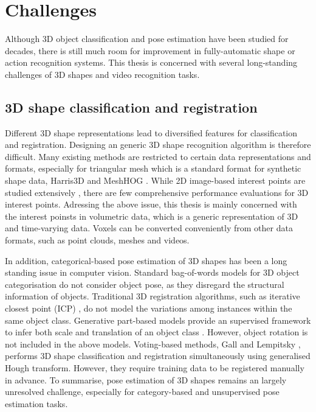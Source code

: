 \section{Challenges}

Although 3D object classification and pose estimation have been studied for decades, there is still much room for improvement in fully-automatic shape or action recognition systems. 
This thesis is concerned with several long-standing challenges of 3D shapes and video recognition tasks.  

\subsection{3D shape classification and registration} 

Different 3D shape representations lead to diversified features for classification and registration. Designing an generic 3D shape recognition algorithm is therefore difficult. Many existing methods are restricted to certain data representations and formats, especially for triangular mesh which is a standard format for synthetic shape data, \eg Harris3D \cite{Sipiran2011} and MeshHOG \cite{Zaharescu2009}.     
While 2D image-based interest points are studied extensively \cite{Mikolajczyk2005}, there are few comprehensive performance evaluations for 3D interest points. 
Adressing the above issue, this thesis is mainly concerned with the interest poinsts in volumetric data, which is a generic representation of 3D and time-varying data. Voxels can be converted conveniently from other data formats, such as point clouds, meshes and videos. 

In addition, categorical-based pose estimation of 3D shapes has been a long standing issue in computer vision.
Standard bag-of-words models for 3D object categorisation do not consider object pose, as they disregard the structural information of objects. Traditional 3D registration algorithms, such as iterative closest point (ICP) \cite{Besl1992}, do not model the variations among instances within the same object class. 
Generative part-based models provide an supervised framework to infer both scale and translation of an object class \cite{Weber2000, Fergus2007}. However, object rotation is not included in the above models. 
Voting-based methods, \eg Gall and Lempitsky \cite{Gall2009a}, performs 3D shape classification and registration simultaneously using generalised Hough transform. However, they require training data to be registered manually in advance.  
To summarise, pose estimation of 3D shapes remains an largely unresolved challenge, especially for category-based and unsupervised pose estimation tasks.  


